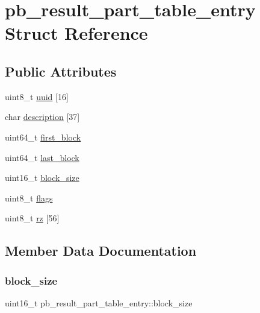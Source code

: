 \hypertarget{structpb__result__part__table__entry}{}\section{pb\+\_\+result\+\_\+part\+\_\+table\+\_\+entry Struct Reference}
\label{structpb__result__part__table__entry}
\subsection*{Public Attributes}
\begin{DoxyCompactItemize}
\item 
uint8\+\_\+t \hyperlink{structpb__result__part__table__entry_ab2c25d3e918316995cb10bf8c5b6e570}{uuid} \mbox{[}16\mbox{]}
\item 
char \hyperlink{structpb__result__part__table__entry_ad674bff063ae41707537251879271f1d}{description} \mbox{[}37\mbox{]}
\item 
uint64\+\_\+t \hyperlink{structpb__result__part__table__entry_a06fa60ef2575572355df4a99b8fa8021}{first\+\_\+block}
\item 
uint64\+\_\+t \hyperlink{structpb__result__part__table__entry_ae2138f883104b134fc86aef6e86c65a3}{last\+\_\+block}
\item 
uint16\+\_\+t \hyperlink{structpb__result__part__table__entry_a3aea21a1faaee753154a66e1d76950b2}{block\+\_\+size}
\item 
uint8\+\_\+t \hyperlink{structpb__result__part__table__entry_a98380186209b742310605b9399da4a25}{flags}
\item 
uint8\+\_\+t \hyperlink{structpb__result__part__table__entry_a29434ef5700b5218b552b4589f9eeb84}{rz} \mbox{[}56\mbox{]}
\end{DoxyCompactItemize}


\subsection{Member Data Documentation}
\mbox{\label{structpb__result__part__table__entry_a3aea21a1faaee753154a66e1d76950b2}} 
\subsubsection{\texorpdfstring{block\+\_\+size}{block\_size}}
{\footnotesize\ttfamily uint16\+\_\+t pb\+\_\+result\+\_\+part\+\_\+table\+\_\+entry\+::block\+\_\+size}

